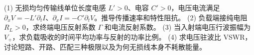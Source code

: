 (1) 无损均匀传输线单位长度电感 \(L'>0\)、电容 \(C'>0\)，电压电流满足 \(\partial_xV=-L'\partial_tI\)、\(\partial_xI=-C'\partial_tV\)。推导传播速率和特性阻抗。
(2) 负载端接纯电阻 \(R_L>0\)，求终端电压反射系数 \(\Gamma\) 和电流反射系数。
(3) 当入射端电压行波振幅为 \(V_+\)，求负载吸收的时间平均功率与反射的功率比例。
(4) 求电压驻波比 VSWR，讨论短路、开路、匹配三种极限以及为何无损线本身不耗散能量。
